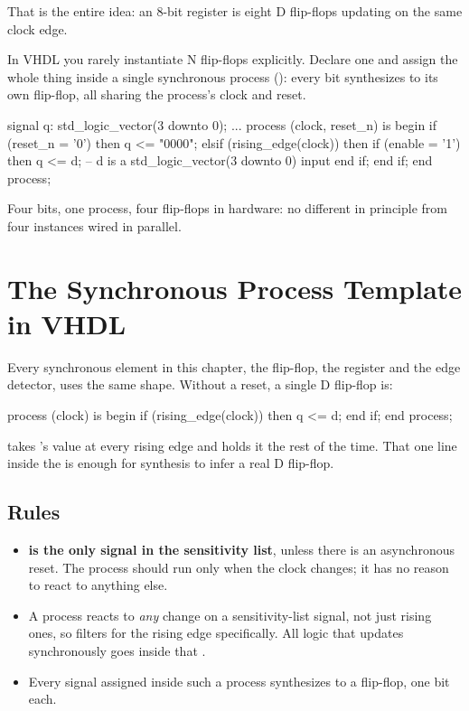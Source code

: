 \noindent That is the entire idea: an 8-bit register is eight D flip-flops updating on the same clock
edge.

In VHDL you rarely instantiate N flip-flops explicitly. Declare one  and
assign the whole thing inside a single synchronous process (): every bit synthesizes
to its own flip-flop, all sharing the process's clock and reset.

\begin{vhdlcode}
signal q: std_logic_vector(3 downto 0);
...
process (clock, reset_n) is
begin
    if (reset_n = '0') then
        q <= "0000";
    elsif (rising_edge(clock)) then
        if (enable = '1') then
            q <= d; -- d is a std_logic_vector(3 downto 0) input
        end if;
    end if;
end process;
\end{vhdlcode}

\noindent Four bits, one process, four flip-flops in hardware: no different in principle from four
 instances wired in parallel.

\section{The Synchronous Process Template in VHDL}
\label{c3:a6}
Every synchronous element in this chapter, the flip-flop, the register and the edge detector, uses
the same shape. Without a reset, a single D flip-flop is:

\begin{vhdlcode}
process (clock) is
begin
    if (rising_edge(clock)) then
        q <= d;
    end if;
end process;
\end{vhdlcode}

\noindent{} takes 's value at every rising edge and holds it the rest of the time. That
one line inside the  is enough for synthesis to infer a real D flip-flop.

\subsection{Rules}
\label{c3:rules}
\begin{itemize}
  \item \textbf{ is the only signal in the sensitivity list}, unless there is an
    asynchronous reset. The process should run only when the clock changes; it has no reason to
    react to anything else.
  \item A process reacts to \emph{any} change on a sensitivity-list signal, not just rising ones, so
     filters for the rising edge specifically. All logic that updates
    synchronously goes inside that .
  \item Every signal assigned inside such a process synthesizes to a flip-flop, one bit each.
\end{itemize}

